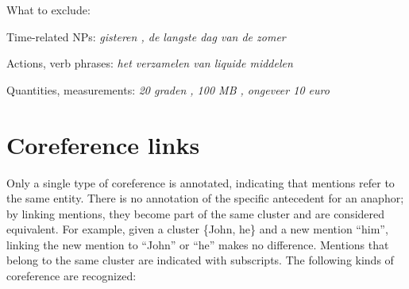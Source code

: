 What to exclude:

\begin{itemize*}
\item Time-related NPs: \emph{\n{[}gisteren\n{]} , \n{[}de langste dag van
  de zomer\n{]}}
\item Actions, verb phrases: \emph{\n{[}het verzamelen van liquide
  middelen\n{]}}
\item Quantities, measurements: \emph{\n{[}20 graden\n{]} , \n{[}100
  MB\n{]} , \n{[}ongeveer 10 euro\n{]}}
\end{itemize*}



\section{Coreference links}

Only a single type of coreference is annotated, indicating that
mentions refer to the same entity. There is no annotation of the
specific antecedent for an anaphor; by linking mentions, they become
part of the same cluster and are considered equivalent. For example,
given a cluster \{John, he\} and a new mention ``him'', linking the new
mention to ``John'' or ``he'' makes no difference. Mentions that belong to the
same cluster are indicated with subscripts. The following kinds of
coreference are recognized:

